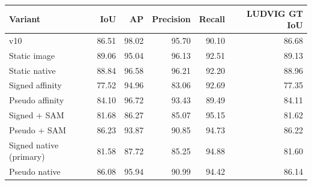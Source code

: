 \begin{tabular}{lrrrrr}
\toprule
Variant & IoU & AP & Precision & Recall & LUDVIG GT IoU \\\midrule
v10 & 86.51 & 98.02 & 95.70 & 90.10 & 86.68 \\
Static image & 89.06 & 95.04 & 96.13 & 92.51 & 89.13 \\
Static native & 88.84 & 96.58 & 96.21 & 92.20 & 88.96 \\
Signed affinity & 77.52 & 94.96 & 83.06 & 92.69 & 77.35 \\
Pseudo affinity & 84.10 & 96.72 & 93.43 & 89.49 & 84.11 \\
Signed + SAM & 81.68 & 86.27 & 85.07 & 95.15 & 81.62 \\
Pseudo + SAM & 86.23 & 93.87 & 90.85 & 94.73 & 86.22 \\
Signed native (primary) & 81.58 & 87.72 & 85.25 & 94.88 & 81.60 \\
Pseudo native & 86.08 & 95.94 & 90.99 & 94.42 & 86.14 \\
\bottomrule
\end{tabular}
